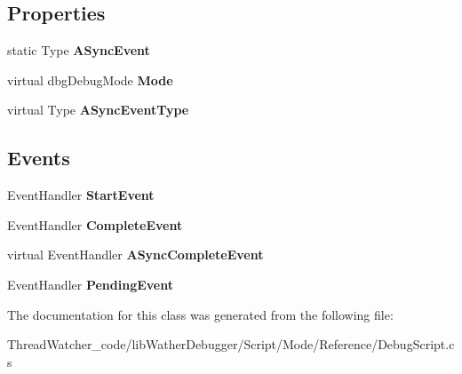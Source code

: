 \subsection*{Properties}
\begin{DoxyCompactItemize}
\item 
\hypertarget{classlib_wather_debugger_1_1_script_1_1_debug_script_a3358bff7951d6a61cd8df66642e3ffce}{static Type {\bfseries A\+Sync\+Event}}\label{classlib_wather_debugger_1_1_script_1_1_debug_script_a3358bff7951d6a61cd8df66642e3ffce}

\item 
\hypertarget{classlib_wather_debugger_1_1_script_1_1_debug_script_a14d77b66d306f1081c4f996972202c3a}{virtual dbg\+Debug\+Mode {\bfseries Mode}}\label{classlib_wather_debugger_1_1_script_1_1_debug_script_a14d77b66d306f1081c4f996972202c3a}

\item 
\hypertarget{classlib_wather_debugger_1_1_script_1_1_debug_script_a2c56ecc1ea30c58e918474d09a643536}{virtual Type {\bfseries A\+Sync\+Event\+Type}}\label{classlib_wather_debugger_1_1_script_1_1_debug_script_a2c56ecc1ea30c58e918474d09a643536}

\end{DoxyCompactItemize}
\subsection*{Events}
\begin{DoxyCompactItemize}
\item 
\hypertarget{classlib_wather_debugger_1_1_script_1_1_debug_script_afe56407110e0df52606ca87d3ac674cc}{Event\+Handler {\bfseries Start\+Event}}\label{classlib_wather_debugger_1_1_script_1_1_debug_script_afe56407110e0df52606ca87d3ac674cc}

\item 
\hypertarget{classlib_wather_debugger_1_1_script_1_1_debug_script_a5bede76b7a7e259bda56460889b24ce4}{Event\+Handler {\bfseries Complete\+Event}}\label{classlib_wather_debugger_1_1_script_1_1_debug_script_a5bede76b7a7e259bda56460889b24ce4}

\item 
\hypertarget{classlib_wather_debugger_1_1_script_1_1_debug_script_a1b310b3a0e5139e7b6e66062cb97e38d}{virtual Event\+Handler {\bfseries A\+Sync\+Complete\+Event}}\label{classlib_wather_debugger_1_1_script_1_1_debug_script_a1b310b3a0e5139e7b6e66062cb97e38d}

\item 
\hypertarget{classlib_wather_debugger_1_1_script_1_1_debug_script_abcc8526cc7fa6203ccedc17e326e29f3}{Event\+Handler {\bfseries Pending\+Event}}\label{classlib_wather_debugger_1_1_script_1_1_debug_script_abcc8526cc7fa6203ccedc17e326e29f3}

\end{DoxyCompactItemize}


The documentation for this class was generated from the following file\+:\begin{DoxyCompactItemize}
\item 
Thread\+Watcher\+\_\+code/lib\+Wather\+Debugger/\+Script/\+Mode/\+Reference/Debug\+Script.\+cs\end{DoxyCompactItemize}
